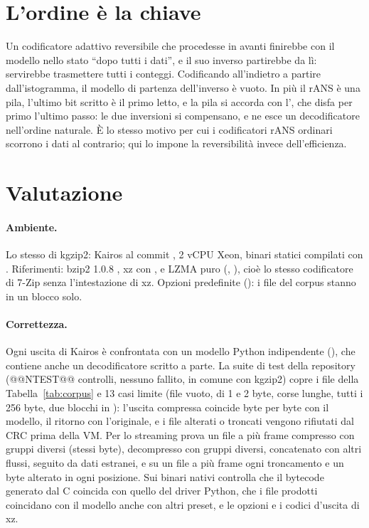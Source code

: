 \section{L'ordine è la chiave}

Un codificatore adattivo reversibile che procedesse in avanti finirebbe con il modello nello stato ``dopo tutti i dati'', e il suo inverso partirebbe da lì: servirebbe trasmettere tutti i conteggi. Codificando all'indietro a partire dall'istogramma, il modello di partenza dell'inverso è vuoto. In più il rANS è una pila, l'ultimo bit scritto è il primo letto, e la pila si accorda con l', che disfa per primo l'ultimo passo: le due inversioni si compensano, e ne esce un decodificatore nell'ordine naturale. È lo stesso motivo per cui i codificatori rANS ordinari scorrono i dati al contrario; qui lo impone la reversibilità invece dell'efficienza.

\section{Valutazione}

\paragraph{Ambiente.} Lo stesso di kgzip2: Kairos al commit , 2 vCPU Xeon, binari statici compilati con . Riferimenti: bzip2 1.0.8 , xz con , e LZMA puro (, ), cioè lo stesso codificatore di 7-Zip senza l'intestazione di xz. Opzioni predefinite (): i file del corpus stanno in un blocco solo.

\paragraph{Correttezza.} Ogni uscita di Kairos è confrontata con un modello Python indipendente (), che contiene anche un decodificatore scritto a parte. La suite di test della repository (@@NTEST@@ controlli, nessuno fallito, in comune con kgzip2) copre i file della Tabella~\ref{tab:corpus} e 13 casi limite (file vuoto, di 1 e 2 byte, corse lunghe, tutti i 256 byte, due blocchi in ): l'uscita compressa coincide byte per byte con il modello, il ritorno con l'originale, e i file alterati o troncati vengono rifiutati dal CRC prima della VM. Per lo streaming prova un file a più frame compresso con gruppi diversi (stessi byte), decompresso con gruppi diversi, concatenato con altri flussi, seguito da dati estranei, e su un file a più frame ogni troncamento e un byte alterato in ogni posizione. Sui binari nativi controlla che il bytecode generato dal C coincida con quello del driver Python, che i file prodotti coincidano con il modello anche con altri preset, e le opzioni e i codici d'uscita di xz.

